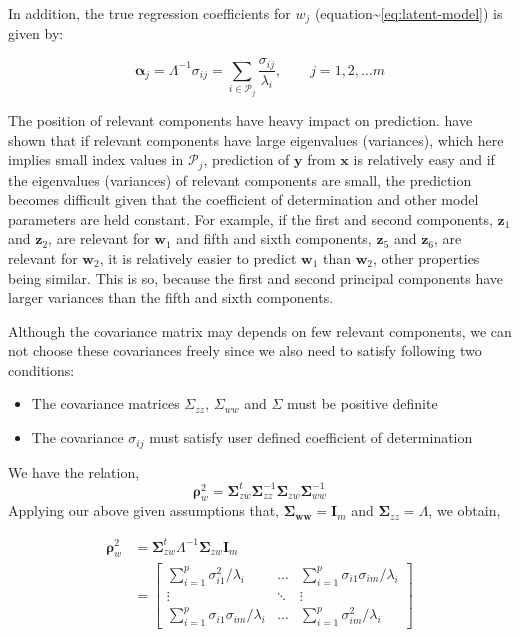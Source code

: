 \documentclass[12pt,A4paper,authoryear]{elsarticle} %
\providecommand{\tightlist}{%
  \setlength{\itemsep}{0pt}\setlength{\parskip}{0pt}}
\theoremstyle{definition}
\theoremstyle{definition}
\theoremstyle{remark}
\begin{document}
In addition, the true regression coefficients for \(w_j\)
(equation\textasciitilde{}\eqref{eq:latent-model}) is given by:

\[
\boldsymbol{\alpha}_j = \Lambda^{-1} \sigma_{ij} = \sum_{i \in \mathcal{P}_j}\frac{\sigma_{ij}}{\lambda_i},\qquad j = 1, 2, \ldots m
\]

The position of relevant components have heavy impact on prediction.
\citet{helland1994comparison} have shown that if relevant components
have large eigenvalues (variances), which here implies small index
values in \(\mathcal{P}_j\), prediction of \(\mathbf{y}\) from
\(\mathbf{x}\) is relatively easy and if the eigenvalues (variances) of
relevant components are small, the prediction becomes difficult given
that the coefficient of determination and other model parameters are
held constant. For example, if the first and second components,
\(\mathbf{z}_1\) and \(\mathbf{z}_2\), are relevant for \(\mathbf{w}_1\)
and fifth and sixth components, \(\mathbf{z}_5\) and \(\mathbf{z}_6\),
are relevant for \(\mathbf{w}_2\), it is relatively easier to predict
\(\mathbf{w}_1\) than \(\mathbf{w}_2\), other properties being similar.
This is so, because the first and second principal components have
larger variances than the fifth and sixth components.

Although the covariance matrix may depends on few relevant components,
we can not choose these covariances freely since we also need to satisfy
following two conditions:

\begin{itemize}
\tightlist
\item
  The covariance matrices \(\Sigma_{zz}\), \(\Sigma_{ww}\) and
  \(\Sigma\) must be positive definite
\item
  The covariance \(\sigma_{ij}\) must satisfy user defined coefficient
  of determination
\end{itemize}

We have the relation,
\[\boldsymbol{\rho}_w^2 = \boldsymbol{\Sigma}_{zw}^t\boldsymbol{\Sigma}_{zz}^{-1}\boldsymbol{\Sigma}_{zw}\boldsymbol{\Sigma}_{ww}^{-1}\]
Applying our above given assumptions that,
\(\boldsymbol{\Sigma_{ww}} = \mathbf{I}_m\) and
\(\boldsymbol{\Sigma}_{zz} = \Lambda\), we obtain,

\[
\begin{aligned}
\boldsymbol{\rho}_w^2 &= \boldsymbol{\Sigma}_{zw}^t \Lambda^{-1} \boldsymbol{\Sigma}_{zw} \mathbf{I}_m \\
&= \begin{bmatrix}
\sum_{i = 1}^p \sigma_{i1}^2/\lambda_i          & \ldots & \sum_{i = 1}^p \sigma_{i1}\sigma_{im}/\lambda_i \\
\vdots                                          & \ddots & \vdots \\
\sum_{i = 1}^p \sigma_{i1}\sigma_{im}/\lambda_i & \ldots & \sum_{i = 1}^p \sigma_{im}^2/\lambda_i
\end{bmatrix}
\end{aligned}
\]
\end{document}

